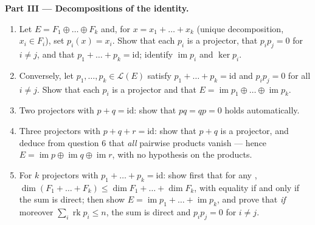 \begin{problem}
\medskip
\noindent\textbf{Part III --- Decompositions of the identity.}
\begin{enumerate}[resume]
  \item Let $E = F_1 \oplus \dots \oplus F_k$ and, for $x = x_1 +
        \dots + x_k$ (unique decomposition, $x_i \in F_i$), set
        $p_i(x) = x_i$. Show that each $p_i$ is a projector, that
        $p_i p_j = 0$ for $i \neq j$, and that $p_1 + \dots + p_k
        = \mathrm{id}$; identify $\operatorname{im} p_i$ and
        $\ker p_i$.
  \item Conversely, let $p_1, \dots, p_k \in \mathcal{L}(E)$
        satisfy $p_1 + \dots + p_k = \mathrm{id}$ and $p_i p_j =
        0$ for all $i \neq j$. Show that each $p_i$ is a
        projector and that $E = \operatorname{im} p_1 \oplus
        \dots \oplus \operatorname{im} p_k$.
  \item Two projectors with $p + q = \mathrm{id}$: show that $pq
        = qp = 0$ holds automatically.
  \item Three projectors with $p + q + r = \mathrm{id}$: show
        that $p + q$ is a projector, and deduce from question 6
        that \emph{all} pairwise products vanish --- hence $E =
        \operatorname{im} p \oplus \operatorname{im} q \oplus
        \operatorname{im} r$, with no hypothesis on the products.
  \item For $k$ projectors with $p_1 + \dots + p_k =
        \mathrm{id}$: show first that for any , $\dim
        (F_1 + \dots + F_k) \leq \dim F_1 + \dots + \dim F_k$,
        with equality if and only if the sum is direct; then
        show $E = \operatorname{im} p_1 + \dots +
        \operatorname{im} p_k$, and prove that \emph{if}
        moreover $\sum_i \operatorname{rk} p_i \leq n$, the sum
        is direct and $p_i p_j = 0$ for $i \neq j$.
\end{enumerate}


\end{problem}
